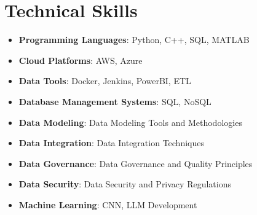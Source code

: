 \documentclass[letterpaper,10pt]{article}
\newcommand{\resumeItem}[1]{\item\small{#1}}
\newcommand{\resumeSubHeadingList}{\begin{itemize}[leftmargin=0.15in, label={}]}
\newcommand{\resumeSubHeadingListEnd}{\end{itemize}}
\begin{document}
\section{Technical Skills}
\resumeSubHeadingList
  \resumeItem{\textbf{Programming Languages}: Python, C++, SQL, MATLAB}
  \resumeItem{\textbf{Cloud Platforms}: AWS, Azure}
  \resumeItem{\textbf{Data Tools}: Docker, Jenkins, PowerBI, ETL}
  \resumeItem{\textbf{Database Management Systems}: SQL, NoSQL}
  \resumeItem{\textbf{Data Modeling}: Data Modeling Tools and Methodologies}
  \resumeItem{\textbf{Data Integration}: Data Integration Techniques}
  \resumeItem{\textbf{Data Governance}: Data Governance and Quality Principles}
  \resumeItem{\textbf{Data Security}: Data Security and Privacy Regulations}
  \resumeItem{\textbf{Machine Learning}: CNN, LLM Development}
\resumeSubHeadingListEnd
\end{document}
